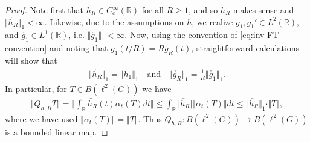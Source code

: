 \documentclass[12pt,a4paper,oneside,final,reqno]{amsart}
\newcommand{\R}{\mathbb{R}}
\theoremstyle{plain}
\theoremstyle{definition}
\begin{document}
\begin{proof}
    Note first that $h_R \in C^\infty_c(\R)$ for all $R \geq 1$, and so $\check{h_R}$ makes sense and $\Vert \check{h_R} \Vert_1 < \infty$. Likewise, due to the assumptions on $h$, we realize $g_1, g_1' \in L^2(\R)$, and  $\check{g_1} \in L^1(\R)$, i.e. $\Vert \check{g_1}\Vert_1 < \infty$. Now, using the convention of \eqref{eq:inv-FT-convention} and noting that $g_1(t/R) = R g_R (t)$, straightforward calculations will show that
    \begin{align*}
        \Vert \check{h_R} \Vert_1 = \Vert \check{h_1}\Vert_1 \quad \text{and} \quad \Vert \check{g_R} \Vert_1 = \frac{1}{R} \Vert \check{g_1} \Vert_1.
    \end{align*}
    In particular, for $T \in B(\ell^2(G))$ we have
    \begin{align*}
        \Vert Q_{h,R}T \Vert = \Vert \int_\R  \check{h_R}(t) \alpha_t(T) dt \Vert \leq \int_\R \vert \check{h_R}\vert \Vert \alpha_t(T) \Vert dt\leq \Vert \check{h_R}\Vert_1 \cdot \Vert T \Vert,
    \end{align*}
    where we have used $\Vert \alpha_t(T) \Vert = \Vert T \Vert$. Thus $Q_{h,R} \colon B(\ell^2(G)) \to B(\ell^2(G)) $ is a bounded linear map. 


\end{proof}
\end{document}
